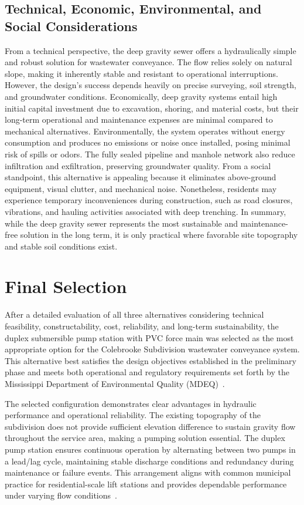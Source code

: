 \subsection{Technical, Economic, Environmental, and Social Considerations}
From a technical perspective, the deep gravity sewer offers a hydraulically simple and robust solution for wastewater conveyance. The flow relies solely on natural slope, making it inherently stable and resistant to operational interruptions. However, the design’s success depends heavily on precise surveying, soil strength, and groundwater conditions. Economically, deep gravity systems entail high initial capital investment due to excavation, shoring, and material costs, but their long-term operational and maintenance expenses are minimal compared to mechanical alternatives. Environmentally, the system operates without energy consumption and produces no emissions or noise once installed, posing minimal risk of spills or odors. The fully sealed pipeline and manhole network also reduce infiltration and exfiltration, preserving groundwater quality. From a social standpoint, this alternative is appealing because it eliminates above-ground equipment, visual clutter, and mechanical noise. Nonetheless, residents may experience temporary inconveniences during construction, such as road closures, vibrations, and hauling activities associated with deep trenching. In summary, while the deep gravity sewer represents the most sustainable and maintenance-free solution in the long term, it is only practical where favorable site topography and stable soil conditions exist.

\section{Final Selection}\label{sec:final_selection}

After a detailed evaluation of all three alternatives considering technical feasibility, constructability, cost, reliability, and long-term sustainability, the duplex submersible pump station with PVC force main was selected as the most appropriate option for the Colebrooke Subdivision wastewater conveyance system. This alternative best satisfies the design objectives established in the preliminary phase and meets both operational and regulatory requirements set forth by the Mississippi Department of Environmental Quality (MDEQ)~\cite{MDEQ_DesignGuidance_2025}.

The selected configuration demonstrates clear advantages in hydraulic performance and operational reliability. The existing topography of the subdivision does not provide sufficient elevation difference to sustain gravity flow throughout the service area, making a pumping solution essential. The duplex pump station ensures continuous operation by alternating between two pumps in a lead/lag cycle, maintaining stable discharge conditions and redundancy during maintenance or failure events. This arrangement aligns with common municipal practice for residential-scale lift stations and provides dependable performance under varying flow conditions~\cite{TenStates_RecommendedStandards_2014}.

